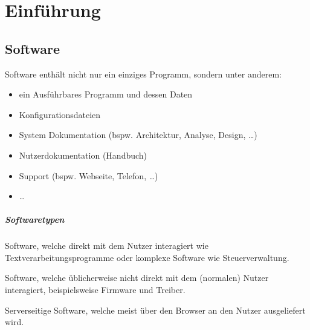 \lstset{language = Java}



\chapter{Einführung}
	\section{Software}
		Software enthält nicht nur ein einziges Programm, sondern unter anderem:
		\begin{itemize}
			\item ein Ausführbares Programm und dessen Daten
			\item Konfigurationsdateien
			\item System Dokumentation (bspw. Architektur, Analyse, Design, \dots)
			\item Nutzerdokumentation (Handbuch)
			\item Support (bspw. Webseite, Telefon, \dots)
			\item \dots
		\end{itemize}

		\paragraph{Softwaretypen}
			\begin{description}[leftmargin = 5cm]
				\item[Applikationssoftware] Software, welche direkt mit dem Nutzer interagiert wie Textverarbeitungsprogramme oder komplexe Software wie Steuerverwaltung.
				\item[Systemsoftware] Software, welche üblicherweise nicht direkt mit dem (normalen) Nutzer interagiert, beispielsweise Firmware und Treiber.
				\item[Software as a Service (SaaS)] Serverseitige Software, welche meist über den Browser an den Nutzer ausgeliefert wird.
			\end{description}


